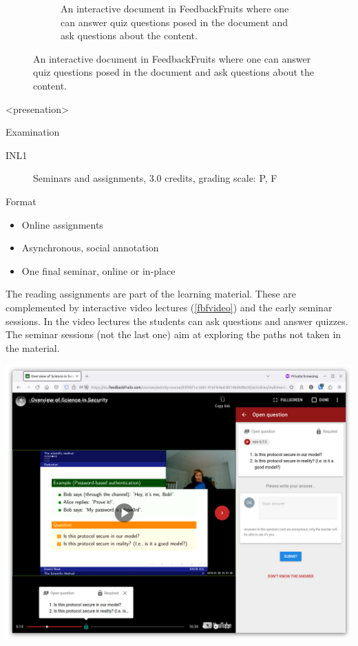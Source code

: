 \begin{figure}[t]
\begin{sidecaption}
\begin{subfigure}[b]{0.49\columnwidth}
      \caption{%
        An interactive document in FeedbackFruits where one can answer quiz 
        questions posed in the document and ask questions about the content.%
        \label{fbfdocquiz}%
      }
    \end{subfigure}
  \end{sidecaption}
\end{figure}

\mode<presenation>{%
\begin{frame}[fragile]
  \begin{block}{Examination}
    \begin{description}
      \item[INL1] Seminars and assignments, 3.0 credits, grading scale: P, F
    \end{description}
  \end{block}

  \pause

  \begin{block}{Format}
    \begin{itemize}
      \item Online assignments
      \item Asynchronous, social annotation
      \item One final seminar, online or in-place
    \end{itemize}
  \end{block}
\end{frame}
}

The reading assignments are part of the learning material.
These are complemented by interactive video lectures (\cref{fbfvideo}) and the 
early seminar sessions.
In the video lectures the students can ask questions and answer quizzes.
The seminar sessions (not the last one) aim at exploring the paths not taken in 
the material.

\begin{marginfigure}
  \includegraphics[width=\columnwidth]{figs/fbf-video-quiz.png}
  \caption{%
    An interactive video in FeedbackFruits where one can answer quiz 
    questions posed in the video.%
  }\label{fbfvideo}
\end{marginfigure}


